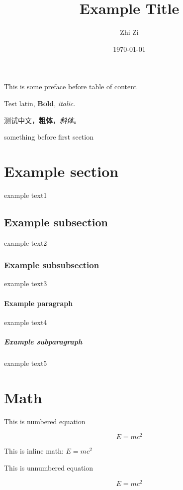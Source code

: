 \documentclass{article}
\title{Example Title}
\author{Zhi Zi}
\date{\today}
\begin{document}
\maketitle

This is some preface before table of content

Test latin, \textbf{Bold}, \textit{italic}.

测试中文，\textbf{粗体}，\textit{斜体}。

\tableofcontents

something before first section

\section{Example section}

example text1

\subsection{Example subsection}

example text2

\subsubsection{Example subsubsection}

example text3

\paragraph{Example paragraph}

example text4

\subparagraph{Example subparagraph}

example text5

\section{Math}

This is numbered equation

\begin{equation}
	E = m c^2
\end{equation}

This is inline math: \( E = mc^2 \)

This is unnumbered equation

\begin{equation*}
	E = mc^2
\end{equation*}
\end{document}
